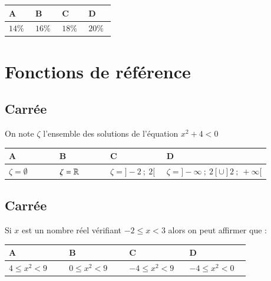 \documentclass[oneside,12pt]{article}
\let\oldsection\section
\renewcommand{\section}{\newpage\oldsection}
\begin{document}
\begin{center}
	\renewcommand{\arraystretch}{1.35}
	\begin{tabular}{| P{0.22\linewidth} | P{0.22\linewidth} | P{0.22\linewidth} | P{0.22\linewidth} |} \hline
	A & B & C & D \\ \hline
	$14\%$ & $16\%$ & $18\%$ & $20\%$ \\ \hline
	\end{tabular}
\end{center}




\section{Fonctions de référence}

\subsection{Carrée}
On note $\zeta$ l'ensemble des solutions de l'équation $x^2+4<0$

\begin{center}
	\renewcommand{\arraystretch}{1.35}
	\begin{tabular}{| P{0.22\linewidth} | P{0.22\linewidth} | P{0.22\linewidth} | P{0.22\linewidth} |} \hline
	A & B & C & D \\ \hline
	\rule{0pt}{5mm}
	$\zeta=\emptyset$ & $\zeta={\mathbb R}$ & $\zeta=]-2~;~2[$ & $\zeta=]-\infty~;~2[\cup]2~;~+\infty[$ \\[2pt] \hline
	\end{tabular}
\end{center}



\subsection{Carrée}
Si $x$ est un nombre réel vérifiant $-2\leq x < 3$ alors on peut affirmer que :

\begin{center}
	\renewcommand{\arraystretch}{1.35}
	\begin{tabular}{| P{0.22\linewidth} | P{0.22\linewidth} | P{0.22\linewidth} | P{0.22\linewidth} |} \hline
	A & B & C & D \\ \hline
	\rule{0pt}{5mm}
	$4\leq x^2 < 9$ & $0\leq x^2 < 9$ & $-4 \leq x^2 < 9$ & $-4 \leq x^2 <0$ \\ \hline
	\end{tabular}
\end{center}
\end{document}
